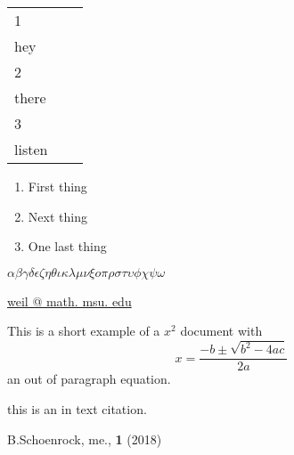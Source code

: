 \documentclass{article}
\begin{document}
\begin{tabular}{|l|c|r|}
\hline 
\hline 1 \\ hey \\
\hline 2 \\ there \\
\hline 3 \\ listen \\
\hline 
\end{tabular}

\begin{enumerate}
\item First thing
\item Next thing
\item One last thing
\end{enumerate}

$\alpha \beta \gamma \delta \epsilon \zeta \eta \theta \iota \kappa \lambda \mu \nu \xi o \pi \rho \sigma \tau \upsilon \phi \chi \psi \omega$

\url{weil @ math. msu. edu}

This is a short example of a $x^{2}$ document with $$x=\frac{-b\pm\sqrt{b^{2}-4ac}}{2a}$$ an out of paragraph equation.

this is an in text citation. \cite{thingy}


\begin{thebibliography}{9}
 B.Schoenrock, me., \textbf{1} (2018)
\end{thebibliography}
\end{document}
